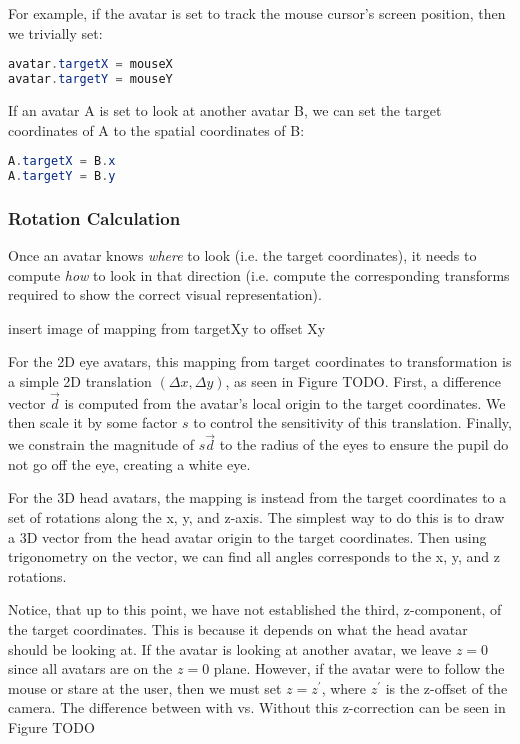 For example, if the avatar is set to track the mouse cursor’s screen position, then we trivially set:

\begin{lstlisting}[language=Java]
avatar.targetX = mouseX
avatar.targetY = mouseY
\end{lstlisting}


If an avatar A is set to look at another avatar B, we can set the target coordinates of A to the spatial coordinates of B:

\begin{lstlisting}[language=Java]
A.targetX = B.x
A.targetY = B.y
\end{lstlisting}

\subsubsection{Rotation Calculation}

Once an avatar knows \textit{where} to look (i.e. the target coordinates),
it needs to compute \textit{how} to look in that direction (i.e. compute the corresponding transforms required to show the correct visual representation).

insert image of mapping from targetXy to offset Xy

For the 2D eye avatars, this mapping from target coordinates to transformation is a simple 2D translation $(\Delta x, \Delta y)$, as seen in Figure TODO. First, a difference vector $\vec d$ is computed from the avatar’s local origin to the target coordinates. We then scale it by some factor $s$ to control the sensitivity of this translation. Finally, we constrain the magnitude of $s\vec d$ to the radius of the eyes to ensure the pupil do not go off the eye, creating a white eye.

For the 3D head avatars, the mapping is instead from the target coordinates to a set of rotations along the x, y, and z-axis. The simplest way to do this is to draw a 3D vector from the head avatar origin to the target coordinates. Then using trigonometry on the vector, we can find all angles corresponds to the x, y, and z rotations.

Notice, that up to this point, we have not established the third, z-component, of the target coordinates. This is because it depends on what the head avatar should be looking at. If the avatar is looking at another avatar, we leave $z = 0$ since all avatars are on the $z = 0$ plane. However, if the avatar were to follow the mouse or stare at the user, then we must set $z = z^\prime$, where $z^\prime$ is the z-offset of the camera. The difference between with vs. Without this z-correction can be seen in Figure TODO

